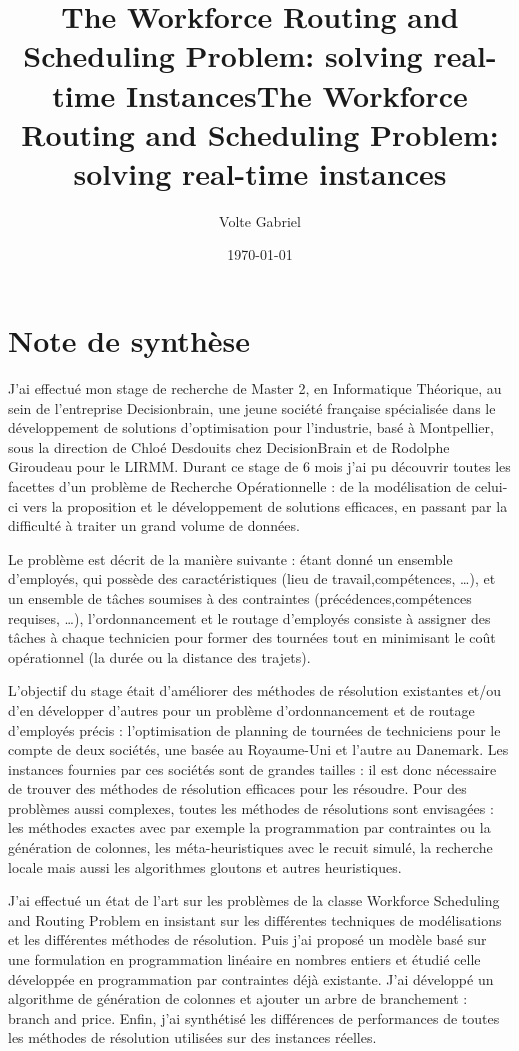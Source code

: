 \documentclass[]{report}
\title{The Workforce Routing and Scheduling Problem: solving real-time Instances}
\title{The Workforce Routing and Scheduling Problem: solving real-time instances}
\author{Volte Gabriel}
\date{\today}
\begin{document}
%
\section*{Note de synthèse}
J'ai effectué mon stage de recherche de Master 2, en Informatique Théorique, au sein de l'entreprise Decisionbrain, une jeune société française spécialisée dans le développement de solutions d'optimisation pour l'industrie, basé à Montpellier, sous la direction de Chloé Desdouits chez DecisionBrain et de Rodolphe Giroudeau pour le LIRMM.
Durant ce stage de 6 mois j'ai pu découvrir toutes les facettes d'un problème de Recherche Opérationnelle : de la modélisation de celui-ci vers la proposition et le développement  de solutions efficaces, en passant par la difficulté à traiter un grand volume de données.

Le problème est décrit de la manière suivante : étant donné un ensemble d'employés, qui possède des caractéristiques (lieu de travail,compétences, \ldots), et un ensemble de tâches soumises à des contraintes (précédences,compétences requises, \ldots), l'ordonnancement et le routage d'employés consiste à assigner des tâches à chaque technicien pour former des tournées tout en minimisant le coût opérationnel (la durée ou la distance des trajets).

L'objectif du stage était d'améliorer des méthodes de résolution existantes et/ou d'en développer d'autres pour un problème d'ordonnancement et de routage d'employés précis : l'optimisation de planning de tournées de techniciens pour le compte de deux sociétés, une basée au Royaume-Uni et l'autre au Danemark.
Les instances fournies par ces sociétés sont de grandes tailles : il est donc nécessaire de trouver des méthodes de résolution efficaces pour les résoudre.
Pour des problèmes aussi complexes, toutes les méthodes de résolutions sont envisagées : les méthodes exactes avec par exemple la programmation par contraintes ou la génération de colonnes, les méta-heuristiques avec le recuit simulé, la recherche locale mais aussi les algorithmes gloutons et autres heuristiques.

J'ai effectué un état de l'art sur les problèmes de la classe Workforce Scheduling and Routing Problem en insistant sur les différentes techniques de modélisations et les différentes méthodes de résolution. 
Puis j'ai proposé un modèle basé sur une formulation en programmation linéaire en nombres entiers et étudié celle développée   en programmation par contraintes déjà existante.
J'ai développé un algorithme de génération de colonnes et ajouter un arbre de branchement : branch and price.
Enfin, j'ai synthétisé les différences de performances de toutes les méthodes de résolution utilisées sur des instances réelles. 
\end{document}
